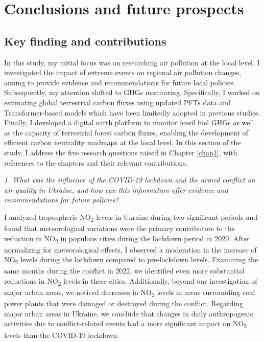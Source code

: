 \chapter{Conclusions and future prospects} \label{chap6}
\section{Key finding and contributions}
In this study, my initial focus was on researching air pollution at the local level. I investigated the impact of extreme events on regional air pollution changes, aiming to provide evidence and recommendations for future local policies. Subsequently, my attention shifted to GHGs monitoring. Specifically, I worked on estimating global terrestrial carbon fluxes using updated PFTs data and Transformer-based models which have been limitedly adopted in previous studies. Finally, I developed a digital earth platform to monitor fossil fuel GHGs as well as the capacity of terrestrial forest carbon fluxes, enabling the development of efficient carbon neutrality roadmaps at the local level. In this section of the study, I address the five research questions raised in Chapter \ref{chap1}, with references to the chapters and their relevant contributions. \par

\textit{1. What was the influence of the COVID-19 lockdown and the armed conflict on air quality in Ukraine, and how can this information offer evidence and recommendations for future policies?} \par
I analyzed tropospheric NO\textsubscript{2} levels in Ukraine during two significant periods and found that meteorological variations were the primary contributors to the reduction in NO\textsubscript{2} in populous cities during the lockdown period in 2020. After normalizing for meteorological effects, I observed a moderation in the increase of NO\textsubscript{2} levels during the lockdown compared to pre-lockdown levels. Examining the same months during the conflict in 2022, we identified even more substantial reductions in NO\textsubscript{2} levels in these cities. Additionally, beyond our investigation of major urban areas, we noticed decreases in NO\textsubscript{2} levels in areas surrounding coal power plants that were damaged or destroyed during the conflict. Regarding major urban areas in Ukraine, we conclude that changes in daily anthropogenic activities due to conflict-related events had a more significant impact on NO\textsubscript{2} levels than the COVID-19 lockdown. \par

